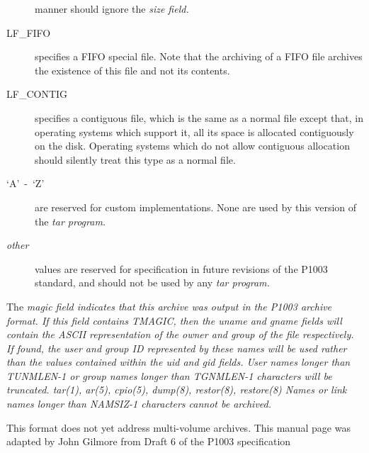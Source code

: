 \begin{description}
manner should ignore the %
\it size \rm%
 field.
\item[{LF\_FIFO}]
specifies a FIFO special file.  Note that the archiving of
a FIFO file archives the existence of this file and not its
contents.
\item[{LF\_CONTIG}]
specifies a contiguous file, which is the same as a normal
file except that, in operating systems which support it,
all its space is allocated contiguously on the disk.  Operating
systems which do not allow contiguous allocation should silently treat
this type as a normal file.
\item[{`A'\ -\ `Z'}]
are reserved for custom implementations.  None are used by this
version of the %
\it tar \rm%
 program.
\item[{\it other\rm}]
values are reserved for specification in future revisions of the
P1003 standard, and should not be used by any %
\it tar \rm%
 program.
\end{description}
The %
\it magic \rm%
 field indicates that this archive was output in the P1003
archive format.  If this field contains TMAGIC, then the
%
\it uname \rm%
 and %
\it gname \rm%
fields will contain the ASCII representation of the owner and group of the
file respectively.  If found, the user and group ID represented by these
names
will be used rather than the values contained
within the %
\it uid \rm%
 and %
\it gid \rm%
 fields.
User names longer than TUNMLEN-1 or group
names longer than TGNMLEN-1 characters will be truncated.
tar(1), ar(5), cpio(5), dump(8), restor(8), restore(8)
Names or link names longer than NAMSIZ-1 characters cannot be archived.

This format does not yet address multi-volume archives.
This manual page was adapted by John Gilmore
from Draft 6 of the P1003 specification

